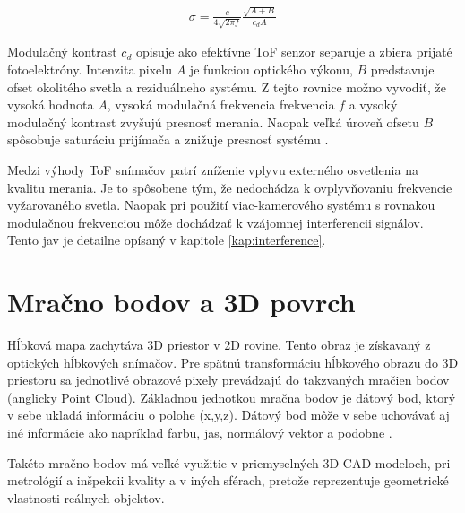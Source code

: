 \begin{equation}
\label{eq7}
\begin{aligned}
\sigma=\frac{c}{4\sqrt{2 \pi f}} \frac{\sqrt{A+B}}{c_d A}
\end{aligned}
\end{equation}

Modulačný kontrast $ c_d $ opisuje ako efektívne ToF senzor separuje a zbiera prijaté fotoelektróny. Intenzita pixelu $ A $ je funkciou optického výkonu, $ B $ predstavuje ofset okolitého svetla a reziduálneho systému. Z tejto rovnice možno vyvodiť, že vysoká hodnota $A$, vysoká modulačná frekvencia frekvencia $f$ a vysoký modulačný kontrast zvyšujú presnosť merania. Naopak veľká úroveň ofsetu $B$ spôsobuje saturáciu prijímača a znižuje presnosť systému \cite{li2014time}. 

Medzi výhody ToF snímačov patrí zníženie vplyvu externého osvetlenia na kvalitu merania. Je to spôsobene tým, že nedochádza k ovplyvňovaniu frekvencie vyžarovaného svetla. Naopak pri použití viac-kamerového systému s rovnakou modulačnou frekvenciou môže dochádzať k vzájomnej interferencii signálov. Tento jav je detailne opísaný v kapitole \ref{kap:interference}.

\section{Mračno bodov a 3D povrch}

Hĺbková mapa zachytáva 3D priestor v 2D rovine. Tento obraz je získavaný z optických hĺbkových snímačov. Pre spätnú transformáciu hĺbkového obrazu do 3D priestoru sa jednotlivé obrazové pixely prevádzajú do takzvaných mračien bodov (anglicky Point Cloud). Základnou jednotkou mračna bodov je dátový bod, ktorý v sebe ukladá informáciu o polohe (x,y,z). Dátový bod môže v sebe uchovávať aj iné informácie ako napríklad farbu, jas, normálový vektor a podobne \cite{chua2017standards}. 

Takéto mračno bodov má veľké využitie v priemyselných 3D CAD modeloch, pri metrológií a inšpekcii kvality a v iných sférach, pretože reprezentuje geometrické vlastnosti reálnych objektov. 

